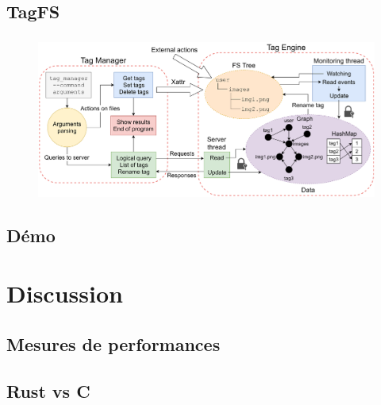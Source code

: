 \documentclass[10pt]{beamer}
\begin{document}
\subsection{TagFS}
\begin{frame}
    \frametitle{\subsecname}
    \begin{center}
        \begin{figure}
            \includegraphics[width=1\textwidth]{images/tagfs4.png}
        \end{figure}
    \end{center}
\end{frame}

\subsection{Démo}
\begin{frame}
    \frametitle{\subsecname}
\end{frame}

\section{Discussion}
\subsection{Mesures de performances}
\begin{frame}
    \frametitle{\subsecname}
\end{frame}

\subsection{Rust vs C}
\begin{frame}
    \frametitle{\subsecname}
\end{frame}
\end{document}

